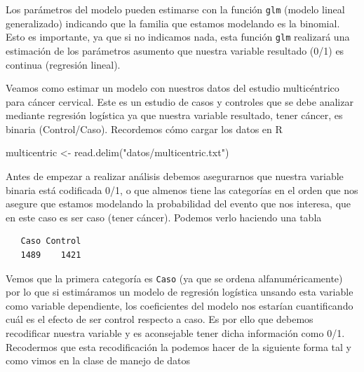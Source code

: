 \documentclass[
]{book}
\newenvironment{Shaded}{\begin{snugshade}}{\end{snugshade}}
\newcommand{\FunctionTok}[1]{\textcolor[rgb]{0.00,0.00,0.00}{#1}}
\newcommand{\NormalTok}[1]{#1}
\newcommand{\OtherTok}[1]{\textcolor[rgb]{0.56,0.35,0.01}{#1}}
\newcommand{\SpecialCharTok}[1]{\textcolor[rgb]{0.00,0.00,0.00}{#1}}
\newcommand{\StringTok}[1]{\textcolor[rgb]{0.31,0.60,0.02}{#1}}
\begin{document}
Los parámetros del modelo pueden estimarse con la función \texttt{glm} (modelo lineal generalizado) indicando que la familia que estamos modelando es la binomial. Esto es importante, ya que si no indicamos nada, esta función \texttt{glm} realizará una estimación de los parámetros asumento que nuestra variable resultado (0/1) es continua (regresión lineal).

Veamos como estimar un modelo con nuestros datos del estudio multicéntrico para cáncer cervical. Este es un estudio de casos y controles que se debe analizar mediante regresión logística ya que nuestra variable resultado, tener cáncer, es binaria (Control/Caso). Recordemos cómo cargar los datos en R

\begin{Shaded}
\begin{Highlighting}[]
\NormalTok{multicentric }\OtherTok{\textless{}{-}} \FunctionTok{read.delim}\NormalTok{(}\StringTok{"datos/multicentric.txt"}\NormalTok{)}
\end{Highlighting}
\end{Shaded}

Antes de empezar a realizar análisis debemos asegurarnos que nuestra variable binaria está codificada 0/1, o que almenos tiene las categorías en el orden que nos asegure que estamos modelando la probabilidad del evento que nos interesa, que en este caso es ser caso (tener cáncer). Podemos verlo haciendo una tabla

\begin{Shaded}
\end{Shaded}

\begin{verbatim}
   Caso Control 
   1489    1421 
\end{verbatim}

Vemos que la primera categoría es \texttt{Caso} (ya que se ordena alfanuméricamente) por lo que si estimáramos un modelo de regresión logística unsando esta variable como variable dependiente, los coeficientes del modelo nos estarían cuantificando cuál es el efecto de ser control respecto a caso. Es por ello que debemos recodificar nuestra variable y es aconsejable tener dicha información como 0/1. Recodermos que esta recodificación la podemos hacer de la siguiente forma tal y como vimos en la clase de manejo de datos
\end{document}
